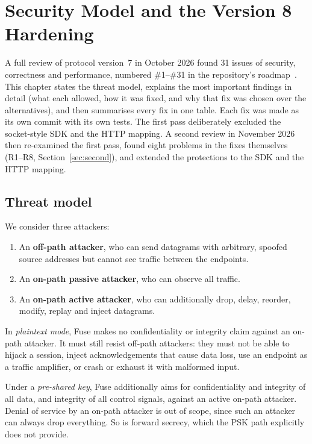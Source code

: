 \chapter{Security Model and the Version 8 Hardening}\label{ch:security}

A full review of protocol version~7 in October 2026 found 31 issues of security, correctness and performance,
numbered \#1--\#31 in the repository's roadmap~\cite{repo}. This chapter states the threat model, explains the
most important findings in detail (what each allowed, how it was fixed, and why that fix was chosen over the
alternatives), and then summarises every fix in one table. Each fix was made as its own commit with its own
tests. The first pass deliberately excluded the socket-style SDK and the HTTP mapping. A second review in
November 2026 then re-examined the first pass, found eight problems in the fixes themselves (R1--R8,
Section~\ref{sec:second}), and extended the protections to the SDK and the HTTP mapping.

\section{Threat model}

We consider three attackers:
\begin{enumerate}
  \item An \textbf{off-path attacker}, who can send datagrams with arbitrary, spoofed source addresses but cannot
    see traffic between the endpoints.
  \item An \textbf{on-path passive attacker}, who can observe all traffic.
  \item An \textbf{on-path active attacker}, who can additionally drop, delay, reorder, modify, replay and inject
    datagrams.
\end{enumerate}

In \emph{plaintext mode}, Fuse makes no confidentiality or integrity claim against an on-path attacker. It must
still resist off-path attackers: they must not be able to hijack a session, inject acknowledgements that cause
data loss, use an endpoint as a traffic amplifier, or crash or exhaust it with malformed input.

Under a \emph{pre-shared key}, Fuse additionally aims for confidentiality and integrity of all data, and
integrity of all control signals, against an active on-path attacker. Denial of service by an on-path attacker
is out of scope, since such an attacker can always drop everything. So is forward secrecy, which the PSK path
explicitly does not provide.

